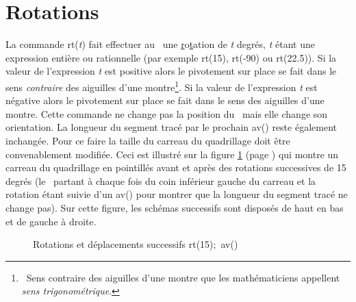 \section{Rotations}
La commande {\idt rt(}{\em t}{\idt )} fait effectuer au \robot\ une \underline{r}o\underline{t}ation de {\em t} degrés,
{\em t} étant une expression entière ou rationnelle (par exemple {\idt rt(15)}, {\idt rt(-90)} ou {\idt rt(22.5)}).
Si la valeur de l'expression {\em t} est positive alors le pivotement sur place se fait dans le sens 
{\em contraire} des aiguilles d'une montre\footnote{\ Sens contraire des aiguilles d'une montre que les mathématiciens
appellent {\em sens trigonométrique}.}. Si la valeur de l'expression {\em t} est négative alors le pivotement sur 
place se fait dans le sens des ai\-guil\-les d'une montre. Cette commande ne change pas la position du \robot\ mais elle change
son orientation. La longueur du segment tracé par le prochain {\idt av()} reste également inchangée. Pour ce faire la taille du 
carreau du quadrillage doit être convenablement modifiée. Ceci est illustré sur la figure \ref{fig:rtexp} 
(page \pageref{fig:rtexp}) qui montre  un carreau du quadrillage en pointillés avant et après des rotations successives de
15 degrés (le \robot\ partant à chaque fois du coin inférieur gauche du carreau et la rotation étant suivie d'un {\idt av()} pour montrer 
que la longueur du segment tracé ne change pas). Sur cette figure, les 
schémas successifs sont disposés de haut en bas et de gauche à droite.
\begin{figure}[htbp]
 \caption{Rotations et déplacements successifs {\idt rt(15);\ av()}}\label{fig:rtexp}
\end{figure}

